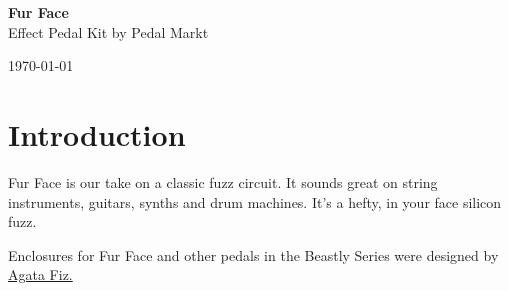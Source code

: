 \documentclass[a4paper,12pt]{article}
\begin{document}
\begin{titlepage}
  \begin{center}
    \Large\textbf{Fur Face}\\
    \large{Effect Pedal Kit by Pedal Markt}
  \end{center}
  \vspace*{\fill}
  \begin{center}
    \today
  \end{center}
\end{titlepage}

\tableofcontents
\pagebreak

\section{Introduction}

Fur Face is our take on a classic fuzz circuit. It sounds
great on string instruments, guitars, synths and drum
machines. It's a hefty, in your face silicon fuzz.

Enclosures for Fur Face and other pedals in the Beastly
Series were designed by \href{https://fiz.gallery/}{Agata
Fiz.}
\end{document}
